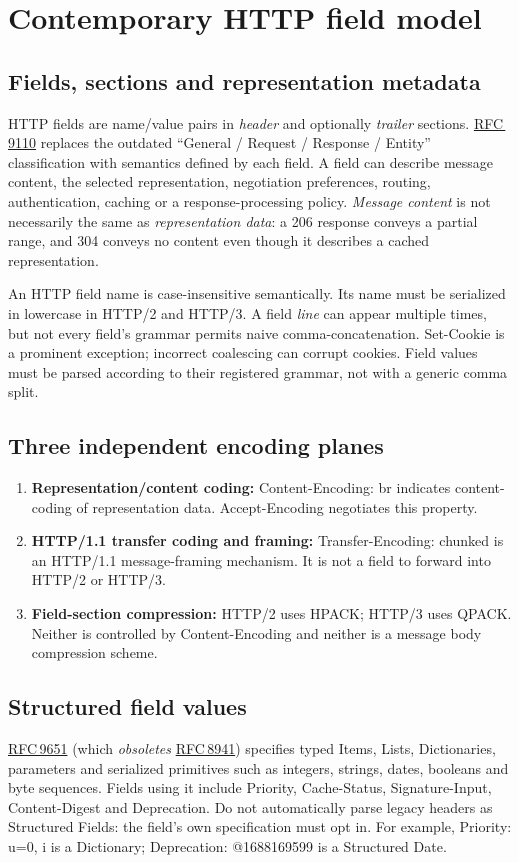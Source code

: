 \documentclass[10pt,letterpaper,oneside]{article}
\newcommand{\field}[1]{{\ttfamily\small\color{Deep}#1}}
\newcommand{\rf}[1]{\href{https://www.rfc-editor.org/rfc/rfc#1.html}{RFC\,#1}}
\begin{document}
\section{Contemporary HTTP field model}
\subsection{Fields, sections and representation metadata}
HTTP fields are name/value pairs in \emph{header} and optionally \emph{trailer} sections. \rf{9110} replaces the outdated ``General / Request / Response / Entity'' classification with semantics defined by each field. A field can describe message content, the selected representation, negotiation preferences, routing, authentication, caching or a response-processing policy. \emph{Message content} is not necessarily the same as \emph{representation data}: a 206 response conveys a partial range, and 304 conveys no content even though it describes a cached representation.

An HTTP field name is case-insensitive semantically. Its name must be serialized in lowercase in HTTP/2 and HTTP/3. A field \emph{line} can appear multiple times, but not every field's grammar permits naive comma-concatenation. \field{Set-Cookie} is a prominent exception; incorrect coalescing can corrupt cookies. Field values must be parsed according to their registered grammar, not with a generic comma split.
\subsection{Three independent encoding planes}
\begin{enumerate}
\item \textbf{Representation/content coding:} \field{Content-Encoding: br} indicates content-coding of representation data. \field{Accept-Encoding} negotiates this property.
\item \textbf{HTTP/1.1 transfer coding and framing:} \field{Transfer-Encoding: chunked} is an HTTP/1.1 message-framing mechanism. It is not a field to forward into HTTP/2 or HTTP/3.
\item \textbf{Field-section compression:} HTTP/2 uses HPACK; HTTP/3 uses QPACK. Neither is controlled by \field{Content-Encoding} and neither is a message body compression scheme.
\end{enumerate}
\subsection{Structured field values}
\rf{9651} (which \emph{obsoletes} \rf{8941}) specifies typed Items, Lists, Dictionaries, parameters and serialized primitives such as integers, strings, dates, booleans and byte sequences. Fields using it include \field{Priority}, \field{Cache-Status}, \field{Signature-Input}, \field{Content-Digest} and \field{Deprecation}. Do not automatically parse legacy headers as Structured Fields: the field's own specification must opt in. For example, \field{Priority: u=0, i} is a Dictionary; \field{Deprecation: @1688169599} is a Structured Date.
\end{document}
